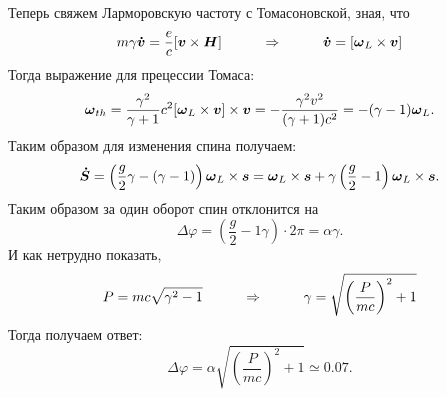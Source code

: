 Теперь свяжем Ларморовскую частоту с Томасоновской, зная, что 
\begin{equation*}
    m \gamma \mbox{\boldmath $\dot{v}$} = \frac{e}{c} [\mbox{\boldmath $v$} \times \mbox{\boldmath $H$}]
    \hspace{1 cm}
    \Rightarrow
    \hspace{1 cm}
    \mbox{\boldmath $\dot{v}$} = [\mbox{\boldmath $\omega$}_L \times \mbox{\boldmath $v$}]
\end{equation*}
Тогда выражение для прецессии Томаса:
\begin{equation*}
    \mbox{\boldmath $\omega$}_{th} = \frac{\gamma^2}{\gamma +1}c^2 [\mbox{\boldmath $\omega$}_L \times \mbox{\boldmath $v$}]\times \mbox{\boldmath $v$} = - \frac{\gamma^2 v^2}{(\gamma+1) c^2} = - (\gamma - 1) \mbox{\boldmath $\omega$}_L.
\end{equation*}
Таким образом для изменения спина получаем:
\begin{equation*}
    \mbox{\boldmath $\dot{S}$} = \left(\frac{g}{2}\gamma - (\gamma - 1)\right) \mbox{\boldmath $\omega$}_L \times \mbox{\boldmath $s$} = \mbox{\boldmath $\omega$}_L \times \mbox{\boldmath $s$} + \gamma \left(\frac{g}{2} - 1\right)\mbox{\boldmath $\omega$}_L \times \mbox{\boldmath $s$}.
\end{equation*}
Таким образом за один оборот спин отклонится на
\begin{equation*}
    \Delta \varphi =  \left(\frac{g}{2} - 1 \gamma\right) \cdot 2 \pi = \alpha \gamma.
\end{equation*}
И как нетрудно показать, 
\begin{equation*}
    P = m c \sqrt{\gamma^2 - 1}
    \hspace{1 cm}
    \Rightarrow
    \hspace{1 cm}
    \gamma = \sqrt{\left(\frac{P}{m c}\right)^2 + 1}
\end{equation*}
Тогда получаем ответ:
\begin{equation*}
    \Delta \varphi = \alpha \sqrt{\left(\frac{P}{m c}\right)^2 + 1} \simeq 0.07.
\end{equation*}